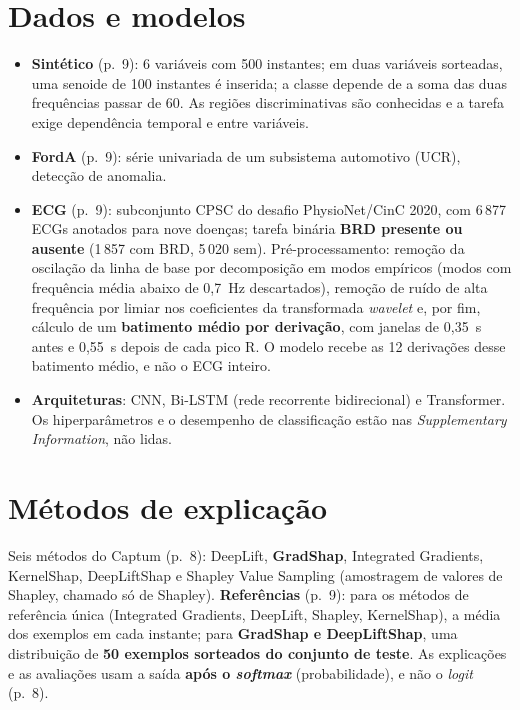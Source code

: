 \documentclass[11pt,a4paper]{article}
\begin{document}
\section{Dados e modelos}
\begin{itemize}
\item \textbf{Sintético} (p.~9): 6 variáveis com 500 instantes; em duas variáveis sorteadas, uma senoide de 100 instantes é inserida; a classe depende de a soma das duas frequências passar de 60. As regiões discriminativas são conhecidas e a tarefa exige dependência temporal e entre variáveis.
\item \textbf{FordA} (p.~9): série univariada de um subsistema automotivo (UCR), detecção de anomalia.
\item \textbf{ECG} (p.~9): subconjunto CPSC do desafio PhysioNet/CinC 2020, com 6\,877 ECGs anotados para nove doenças; tarefa binária \textbf{BRD presente ou ausente} (1\,857 com BRD, 5\,020 sem). Pré-processamento: remoção da oscilação da linha de base por decomposição em modos empíricos (modos com frequência média abaixo de 0,7~Hz descartados), remoção de ruído de alta frequência por limiar nos coeficientes da transformada \textit{wavelet} e, por fim, cálculo de um \textbf{batimento médio por derivação}, com janelas de 0,35~s antes e 0,55~s depois de cada pico R. O modelo recebe as 12 derivações desse batimento médio, e não o ECG inteiro.
\item \textbf{Arquiteturas}: CNN, Bi-LSTM (rede recorrente bidirecional) e Transformer. Os hiperparâmetros e o desempenho de classificação estão nas \textit{Supplementary Information}, não lidas.
\end{itemize}

\section{Métodos de explicação}
Seis métodos do Captum (p.~8): DeepLift, \textbf{GradShap}, Integrated Gradients, KernelShap, DeepLiftShap e Shapley Value Sampling (amostragem de valores de Shapley, chamado só de Shapley). \textbf{Referências} (p.~9): para os métodos de referência única (Integrated Gradients, DeepLift, Shapley, KernelShap), a média dos exemplos em cada instante; para \textbf{GradShap e DeepLiftShap}, uma distribuição de \textbf{50 exemplos sorteados do conjunto de teste}. As explicações e as avaliações usam a saída \textbf{após o \textit{softmax}} (probabilidade), e não o \textit{logit} (p.~8).
\end{document}
